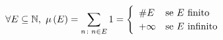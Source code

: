 \begin{examples}
\begin{enumerate}
	\begin{equation}
	\forall E\subseteq\naturalset,\ \mu\left(E\right)=\sum_{n\colon n\in E}1=\begin{cases}
		\begin{array}{ll}
			\# E&\text{se }E\text{ finito}\\
			+\infty&\text{se }E\text{ infinito}
		\end{array}
	\end{cases}
\end{equation}
	\end{enumerate}
\end{examples}


